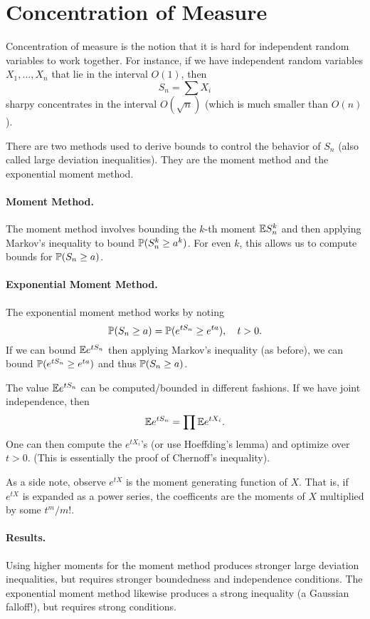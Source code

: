\section*{Concentration of Measure}

Concentration of measure is the notion that it is hard for independent random variables to work together. For instance, if we have independent random variables $X_1, \dots, X_n$ that lie in the interval $O(1)$, then
\[
    S_n = \sum X_i
\]
sharpy concentrates in the interval $O(\sqrt{n})$ (which is much smaller than $O(n)$).

There are two methods used to derive bounds to control the behavior of $S_n$ (also called large deviation inequalities). They are the moment method and the exponential moment method.

\paragraph{Moment Method.} The moment method involves bounding the $k$-th moment ${\mathbb E} S_n^k$ and then applying Markov's inequality to bound ${\mathbb P}(S_n^k \geq a^k)$. For even $k$, this allows us to compute bounds for ${\mathbb P}(S_n \geq a)$.

\paragraph{Exponential Moment Method.} The exponential moment method works by noting
\[
    {\mathbb P}(S_n \geq a) = {\mathbb P}( e^{tS_n} \geq e^{ta}), \quad t > 0.
\]
If we can bound ${\mathbb E} e^{tS_n}$ then applying Markov's inequality (as before), we can bound ${\mathbb P}( e^{tS_n} \geq e^{ta})$ and thus ${\mathbb P}(S_n \geq a)$.

The value ${\mathbb E} e^{tS_n}$ can be computed/bounded in different fashions. If we have joint independence, then
\[
    {\mathbb E} e^{tS_n} = \prod {\mathbb E} e^{tX_i}.
\]
One can then compute the $e^{tX_i}$'s (or use Hoeffding's lemma) and optimize over $t > 0$. (This is essentially the proof of Chernoff's inequality).

As a side note, observe $e^{tX}$ is the moment generating function of $X$. That is, if $e^{tX}$ is expanded as a power series, the coefficents are the moments of $X$ multiplied by some $t^m/m!$.

\paragraph{Results.} Using higher moments for the moment method produces stronger large deviation inequalities, but requires stronger boundedness and independence conditions. The exponential moment method likewise produces a strong inequality (a Gaussian falloff!), but requires strong conditions.

